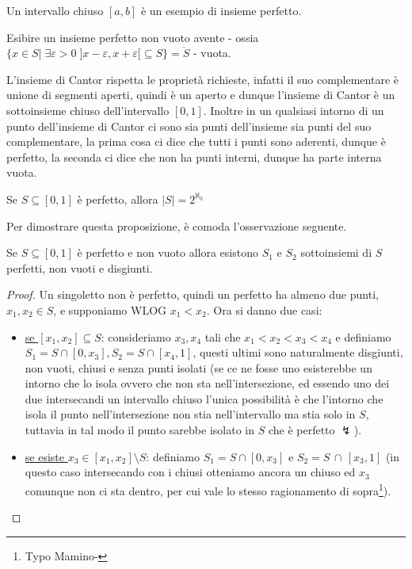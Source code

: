 \begin{example}
	Un intervallo chiuso $[a,b]$ \`e un esempio di insieme perfetto.
\end{example}

\begin{exercise}
	Esibire un insieme perfetto non vuoto avente  - ossia $\{x \in S | \; \exists \varepsilon > 0 \; ]x -\varepsilon,x+\varepsilon[ \subseteq S\} = \mathring{S}$ - vuota.
\end{exercise}

\begin{soln}
	L'insieme di Cantor rispetta le propriet\`a richieste, infatti il suo complementare \`e unione di segmenti aperti, quindi \`e un aperto e dunque l'insieme di Cantor \`e un sottoinsieme chiuso dell'intervallo $[0,1]$.
	Inoltre in un qualsiasi intorno di un punto dell'insieme di Cantor ci sono sia punti dell'insieme sia punti del suo complementare, la prima cosa ci dice che tutti i punti sono aderenti, dunque \`e perfetto, la seconda ci dice che non ha punti interni,
	dunque ha parte interna vuota.
\end{soln}

\begin{proposition}
	Se $S \subseteq [0,1]$ \`e perfetto, allora $|S| = 2^{\aleph_0}$
\end{proposition}

Per dimostrare questa proposizione, \`e comoda l'osservazione seguente.

\begin{remark}
	Se $S \subseteq [0,1]$ \`e perfetto e non vuoto allora esistono $S_1$ e $S_2$ sottoinsiemi di $S$ perfetti, non vuoti e disgiunti.
\end{remark}

\begin{proof}
	Un singoletto non \`e perfetto, quindi un perfetto ha almeno due punti, $x_1,x_2 \in S$, e supponiamo WLOG $x_1 < x_2$. Ora si danno due casi:
	\begin{itemize}
		\item \underline{se $[x_1,x_2] \subseteq S$}: consideriamo $x_3,x_4$ tali che $x_1 < x_2 < x_3 < x_4$ e definiamo $S_1 = S \cap [0,x_3], S_2 = S \cap [x_4,1]$, questi ultimi sono naturalmente disgiunti, non vuoti, chiusi e senza punti isolati
		(se ce ne fosse uno esisterebbe un intorno che lo isola ovvero che non sta nell'intersezione, ed essendo uno dei due intersecandi un intervallo chiuso l'unica possibilit\`a \`e che l'intorno che isola il punto 
		nell'intersezione non stia nell'intervallo ma stia solo in $S$, tuttavia in tal modo il punto sarebbe isolato in $S$ che \`e perfetto $\lightning$).
		\item \underline{se esiste $x_3 \in [x_1,x_2]\setminus S$}: definiamo $S_1 = S \cap [0,x_3]$ e $S_2 = S \,\cap\, [x_3,1]$ (in questo caso intersecando con i chiusi otteniamo ancora un chiuso ed $x_3$ comunque non ci sta dentro, per cui vale lo stesso ragionamento di sopra\footnote{Typo Mamino-}).
	\end{itemize}
\end{proof}

